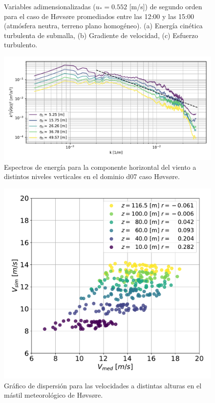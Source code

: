 \begin{figure}[H]
\begin{center}
	\end{center}
	\caption{Variables adimensionalizadas ($u_* = 0.552$ [m/s]) de segundo orden para el caso de Høvsøre promediados entre las 12:00 y las 15:00 (atmósfera neutra, terreno plano homogéneo). (a) Energía cinética turbulenta de submalla, (b) Gradiente de velocidad, (c) Esfuerzo turbulento. }
	\label{fig:06_hov_mean_secondorder}
\end{figure}

\begin{figure}[H]
	\centering
	\includegraphics[width=1.0\linewidth,page=1,trim={3mm 5mm 3mm 3mm},clip]{Imagenes/06/hov/spectra}%
	\caption{Espectros de energía para la componente horizontal del viento a distintos niveles verticales en el dominio d07 caso Høvsøre.}
	\label{fig:06_hov_spectrum}
\end{figure}

\begin{figure}[H]
	\centering
	\includegraphics[width=0.55\linewidth,page=1,trim={0cm 0cm 0cm 0cm},clip]{Imagenes/06/hov/corr}%
	\caption{Gráfico de dispersión para las velocidades a distintas alturas en el mástil meteorológico de Høvsøre.}
	\label{fig:06_corr_hov}
\end{figure}

